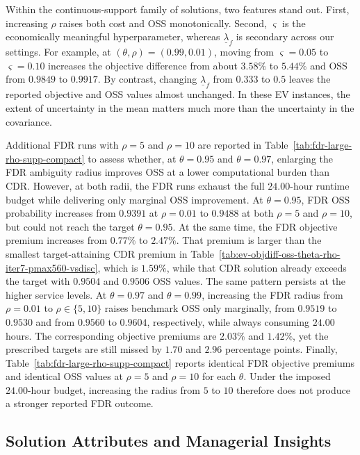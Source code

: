 \documentclass[opre,sglanonrev]{informs4}
\begin{document}
{Within the continuous-support family of solutions, two features stand out. First, increasing \(\rho\) raises both cost and OSS monotonically. Second, \(\varsigma\) is the economically meaningful hyperparameter, whereas \(\underline{\lambda}_f\) is secondary across our settings. For example, at \((\theta,\rho)=(0.99,0.01)\), moving from \(\varsigma=0.05\) to \(\varsigma=0.10\) increases the objective difference from about \(3.58\%\) to \(5.44\%\) and OSS from \(0.9849\) to \(0.9917\). By contrast, changing \(\underline{\lambda}_f\) from \(0.333\) to \(0.5\) leaves the reported objective and OSS values almost unchanged. In these EV instances, the extent of uncertainty in the mean matters much more than the uncertainty in the covariance. 

Additional FDR runs with $\rho=5$ and $\rho=10$ are reported in Table~\ref{tab:fdr-large-rho-supp-compact} to assess whether, at $\theta=0.95$ and $\theta=0.97$, enlarging the FDR ambiguity radius improves OSS at a lower computational burden than CDR. However, at both radii, the FDR runs exhaust the full $24.00$-hour runtime budget while delivering only marginal OSS improvement. At $\theta=0.95$, FDR OSS probability increases from $0.9391$ at $\rho=0.01$ to $0.9488$ at both $\rho=5$ and $\rho=10$, but could not reach the target $\theta=0.95$. At the same time, the FDR objective premium increases from $0.77\%$ to $2.47\%$. That premium is larger than the smallest target-attaining CDR premium in Table~\ref{tab:ev-objdiff-oss-theta-rho-iter7-pmax560-vsdisc}, which is $1.59\%$, while that CDR solution already exceeds the target with $0.9504$ and $0.9506$ OSS values. The same pattern persists at the higher service levels. At $\theta=0.97$ and $\theta=0.99$, increasing the FDR radius from $\rho=0.01$ to $\rho \in \{5,10\}$ raises benchmark OSS only marginally, from $0.9519$ to $0.9530$ and from $0.9560$ to $0.9604$, respectively, while always consuming $24.00$ hours. The corresponding objective premiums are $2.03\%$ and $1.42\%$, yet the prescribed targets are still missed by $1.70$ and $2.96$ percentage points. Finally, Table~\ref{tab:fdr-large-rho-supp-compact} reports identical FDR objective premiums and identical OSS values at $\rho=5$ and $\rho=10$ for each $\theta$. Under the imposed $24.00$-hour budget, increasing the radius from $5$ to $10$ therefore does not produce a stronger reported FDR outcome.

\subsection{Solution Attributes and Managerial Insights}
\label{sec:compare-solution}

}
\end{document}
